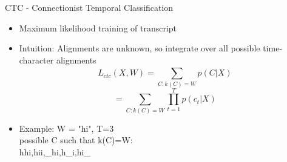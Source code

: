 \documentclass[10pt]{beamer}
\begin{document}
\begin{frame}[fragile]{CTC - Connectionist Temporal Classification}
\begin{itemize}
	\item Maximum likelihood training of transcript
	\item Intuition: Alignments are unknown, so integrate over all possible time-character alignments
	$$L_{ctc}(X,W) = \sum_{C: k(C)=W}^{}p(C|X)$$
	$$= \sum_{C: k(C)=W}^{}\prod_{t=1}^{T}p(c_t|X)$$

	\item Example: W = "hi", T=3\\
	possible C such that k(C)=W:\\
	hhi,hii,\_hi,h\_i,hi\_
\end{itemize}
\end{frame}


\end{document}
